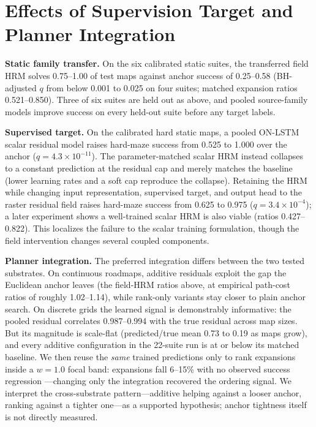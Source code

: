 \documentclass[letterpaper]{article} %
\begin{document}
\section{Effects of Supervision Target and Planner Integration}

\textbf{Static family transfer.} On the six calibrated static suites, the transferred field HRM solves 0.75--1.00 of test maps against anchor success of 0.25--0.58 (BH-adjusted $q$ from below 0.001 to 0.025 on four suites; matched expansion ratios 0.521--0.850). Three of six suites are held out as above, and pooled source-family models improve success on every held-out suite before any target labels.

\textbf{Supervised target.} On the calibrated hard static maps, a pooled ON-LSTM scalar residual model raises hard-maze success from 0.525 to 1.000 over the anchor ($q=4.3\times10^{-11}$). The parameter-matched scalar HRM instead collapses to a constant prediction at the residual cap and merely matches the baseline (lower learning rates and a soft cap reproduce the collapse). Retaining the HRM while changing input representation, supervised target, and output head to the raster residual field raises hard-maze success from 0.625 to 0.975 ($q=3.4\times10^{-4}$); a later experiment shows a well-trained scalar HRM is also viable (ratios 0.427--0.822). This localizes the failure to the scalar training formulation, though the field intervention changes several coupled components.

\textbf{Planner integration.} The preferred integration differs between the two tested substrates. On continuous roadmaps, additive residuals exploit the gap the Euclidean anchor leaves (the field-HRM ratios above, at empirical path-cost ratios of roughly 1.02--1.14), while rank-only variants stay closer to plain anchor search. On discrete grids the learned signal is demonstrably informative: the pooled residual correlates 0.987--0.994 with the true residual across map sizes. But its magnitude is scale-flat (predicted/true mean 0.73 to 0.19 as maps grow), and every additive configuration in the 22-suite run is at or below its matched baseline. We then reuse the \emph{same} trained predictions only to rank expansions inside a $w{=}1.0$ focal band: expansions fall 6--15\% with no observed success regression \citep{chrestien2023rank}---changing only the integration recovered the ordering signal. We interpret the cross-substrate pattern---additive helping against a looser anchor, ranking against a tighter one---as a supported hypothesis; anchor tightness itself is not directly measured.
\end{document}
